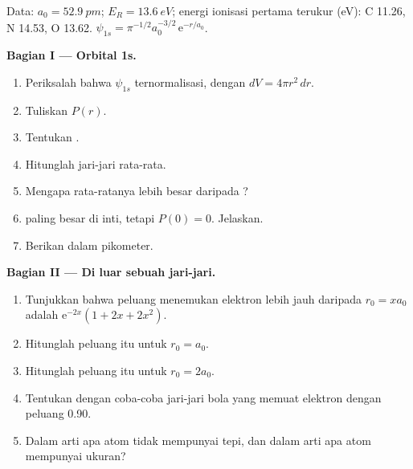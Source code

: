 \begin{problem}
\label{pb:b2:atomic-orbitals:1}
Data: $a_0 = \qty{52.9}{pm}$; $E_R = \qty{13.6}{eV}$; energi ionisasi
pertama terukur (\unit{eV}): C 11.26, N 14.53, O 13.62. $\psi_{1s} = \pi^{-1/2}a_0^{-3/2}\,
\mathrm e^{-r/a_0}$.

\medskip
\noindent\textbf{Bagian I --- Orbital 1s.}
\begin{enumerate}
  \item Periksalah bahwa $\psi_{1s}$ ternormalisasi, dengan
        $dV = 4\pi r^2\,dr$.
  \item Tuliskan  $P(r)$.
  \item Tentukan .
  \item Hitunglah jari-jari rata-rata.
  \item Mengapa rata-ratanya lebih besar daripada ?
  \item {} paling besar di inti, tetapi $P(0) = 0$.
        Jelaskan.
  \item Berikan  dalam pikometer.
\end{enumerate}

\medskip
\noindent\textbf{Bagian II --- Di luar sebuah jari-jari.}
\begin{enumerate}[resume]
  \item Tunjukkan bahwa peluang menemukan elektron lebih jauh daripada
        $r_0 =
        xa_0$ adalah $\mathrm e^{-2x}(1 + 2x + 2x^2)$.
  \item Hitunglah peluang itu untuk $r_0 = a_0$.
  \item Hitunglah peluang itu untuk $r_0 = 2a_0$.
  \item Tentukan dengan coba-coba jari-jari bola yang memuat elektron
        dengan peluang 0.90.
  \item Dalam arti apa atom tidak mempunyai tepi, dan dalam arti apa atom
        mempunyai ukuran?
\end{enumerate}


\end{problem}
